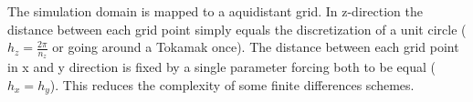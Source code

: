 \documentclass[master.tex]{subfiles}
\begin{document}
The simulation domain is mapped to a aquidistant grid. In z-direction the distance between each grid point simply equals the discretization of a unit circle ($h_z= \frac{2\pi}{n_z}$ or going around a Tokamak once). The distance between each grid point in x and y direction is fixed by a single parameter forcing both to be equal ($h_x = h_y$). This reduces the complexity of some finite differences schemes. 
\end{document}
